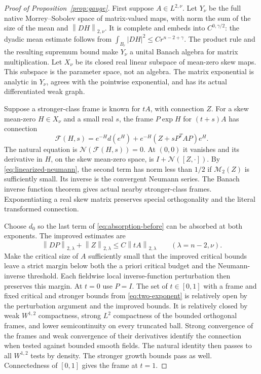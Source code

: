 \documentclass[reqno,11pt]{amsart}
\numberwithin{equation}{section}
\theoremstyle{definition}
\theoremstyle{remark}
\newcommand{\M}{\mathcal M}
\newcommand{\norm}[1]{\left\lVert#1\right\rVert}
\begin{document}
\begin{proof}[Proof of Proposition~\ref{prop:gauge}]
First suppose $A\in L^{2,\nu}$. Let $Y_\nu$ be the full native
Morrey--Sobolev space of matrix-valued maps, with norm the sum of
the size of the mean and $\norm{DH}_{2,\nu}$. It is complete and embeds
into $C^{0,\gamma/2}$: the dyadic mean estimate follows from
$\int_{B_r}|DH|^2\leq Cr^{n-2+\gamma}$. The product rule and the
resulting supremum bound make $Y_\nu$ a unital Banach algebra for
matrix multiplication. Let $X_\nu$ be its closed real linear subspace
of mean-zero skew maps. This subspace is the parameter space, not an
algebra. The matrix exponential is analytic in $Y_\nu$, agrees with
the pointwise exponential, and has its actual differentiated weak graph.

Suppose a stronger-class frame is known for $tA$, with connection $Z$.
For a skew mean-zero $H\in X_\nu$ and a small real $s$, the frame
$P\exp H$ for $(t+s)A$ has connection
\[
 \mathcal F(H,s)=e^{-H}d(e^H)+e^{-H}(Z+sP^TAP)e^H.
\]
The natural equation is $\mathcal N(\mathcal F(H,s))=0$. At $(0,0)$
it vanishes and its derivative in $H$, on the skew mean-zero space, is
$I+\mathcal N([Z,\cdot])$. By
\eqref{eq:linearized-neumann}, the second term has norm less than
$1/2$ if $\M_2(Z)$ is sufficiently small. Its inverse is the
convergent Neumann series. The Banach inverse function theorem gives
actual nearby stronger-class frames. Exponentiating a real skew matrix
preserves special orthogonality and the literal transformed connection.

Choose $d_0$ so the last term of \eqref{eq:absorption-before} can be
absorbed at both exponents. The improved estimates are
\begin{equation}\label{eq:two-exponent}
 \norm{DP}_{2,\lambda}+\norm Z_{2,\lambda}
 \leq C\norm{tA}_{2,\lambda}\qquad(\lambda=n-2,\nu).
\end{equation}
Make the critical size of $A$ sufficiently small that the improved
critical bounds leave a strict margin below both the a priori critical
budget and the Neumann-inverse threshold. Each fieldwise local
inverse-function perturbation then preserves this margin. At $t=0$
use $P=I$. The set of $t\in[0,1]$ with a frame and fixed critical
and stronger bounds from \eqref{eq:two-exponent} is relatively open
by the perturbation argument and the improved bounds. It is relatively
closed by weak $W^{1,2}$ compactness, strong $L^2$ compactness of the
bounded orthogonal frames, and lower semicontinuity on every truncated
ball. Strong convergence of the frames and weak convergence of their
derivatives identify the connection when tested against bounded smooth
fields. The natural identity then passes to all $W^{1,2}$ tests by
density. The stronger growth bounds pass as well. Connectedness of
$[0,1]$ gives the frame at $t=1$.


\end{proof}
\end{document}
